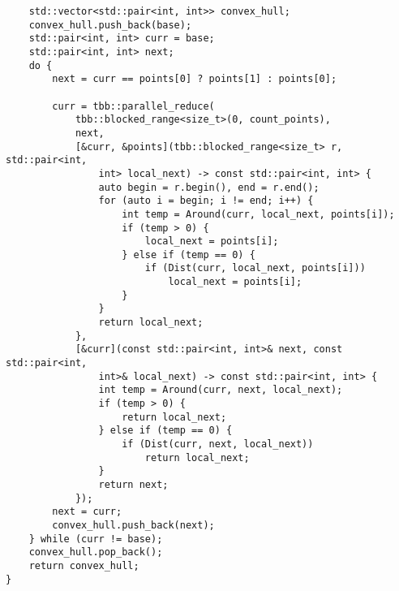 \documentclass{report}
\begin{document}
\begin{lstlisting}
    std::vector<std::pair<int, int>> convex_hull;
    convex_hull.push_back(base);
    std::pair<int, int> curr = base;
    std::pair<int, int> next;
    do {
        next = curr == points[0] ? points[1] : points[0];

        curr = tbb::parallel_reduce(
            tbb::blocked_range<size_t>(0, count_points),
            next,
            [&curr, &points](tbb::blocked_range<size_t> r, std::pair<int,
                int> local_next) -> const std::pair<int, int> {
                auto begin = r.begin(), end = r.end();
                for (auto i = begin; i != end; i++) {
                    int temp = Around(curr, local_next, points[i]);
                    if (temp > 0) {
                        local_next = points[i];
                    } else if (temp == 0) {
                        if (Dist(curr, local_next, points[i]))
                            local_next = points[i];
                    }
                }
                return local_next;
            },
            [&curr](const std::pair<int, int>& next, const std::pair<int,
                int>& local_next) -> const std::pair<int, int> {
                int temp = Around(curr, next, local_next);
                if (temp > 0) {
                    return local_next;
                } else if (temp == 0) {
                    if (Dist(curr, next, local_next))
                        return local_next;
                }
                return next;
            });
        next = curr;
        convex_hull.push_back(next);
    } while (curr != base);
    convex_hull.pop_back();
    return convex_hull;
}


\end{lstlisting}
\end{document}
